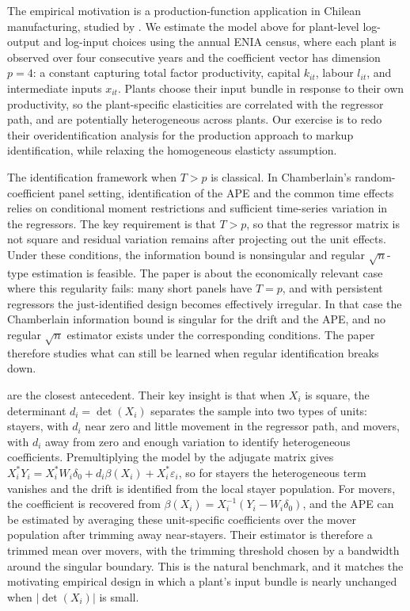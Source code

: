 \documentclass{article}
\begin{document}
The empirical motivation is a production-function application in Chilean manufacturing, studied by \cite{Raval2023}. We estimate the model above for plant-level log-output and log-input choices using the annual ENIA census, where each plant is observed over four consecutive years and the coefficient vector has dimension $p=4$: a constant capturing total factor productivity, capital $k_{it}$, labour $l_{it}$, and intermediate inputs $x_{it}$. Plants choose their input bundle in response to their own productivity, so the plant-specific elasticities are correlated with the regressor path, and are potentially heterogeneous across plants. Our exercise is to redo their overidentification analysis for the production approach to markup identification, while relaxing the homogeneous elasticty assumption. 

The identification framework when $T>p$ is classical. In Chamberlain's random-coefficient panel setting, identification of the APE and the common time effects relies on conditional moment restrictions and sufficient time-series variation in the regressors. The key requirement is that $T>p$, so that the regressor matrix is not square and residual variation remains after projecting out the unit effects. Under these conditions, the information bound is nonsingular and regular $\sqrt{n}$-type estimation is feasible. The paper is about the economically relevant case where this regularity fails: many short panels have $T=p$, and with persistent regressors the just-identified design becomes effectively irregular. In that case the Chamberlain information bound is singular for the drift and the APE, and no regular $\sqrt{n}$ estimator exists under the corresponding conditions. The paper therefore studies what can still be learned when regular identification breaks down.

\cite{grahampowell} are the closest antecedent. Their key insight is that when $X_i$ is square, the determinant $d_i=\det(X_i)$ separates the sample into two types of units: stayers, with $d_i$ near zero and little movement in the regressor path, and movers, with $d_i$ away from zero and enough variation to identify heterogeneous coefficients. Premultiplying the model by the adjugate matrix gives $X_i^{*}Y_i = X_i^{*}W_i\delta_0 + d_i\beta(X_i)+X_i^{*}\varepsilon_i$, so for stayers the heterogeneous term vanishes and the drift is identified from the local stayer population. For movers, the coefficient is recovered from $\beta(X_i)=X_i^{-1}(Y_i-W_i\delta_0)$, and the APE can be estimated by averaging these unit-specific coefficients over the mover population after trimming away near-stayers. Their estimator is therefore a trimmed mean over movers, with the trimming threshold chosen by a bandwidth around the singular boundary. This is the natural benchmark, and it matches the motivating empirical design in which a plant's input bundle is nearly unchanged when $|\det(X_i)|$ is small.
\end{document}
